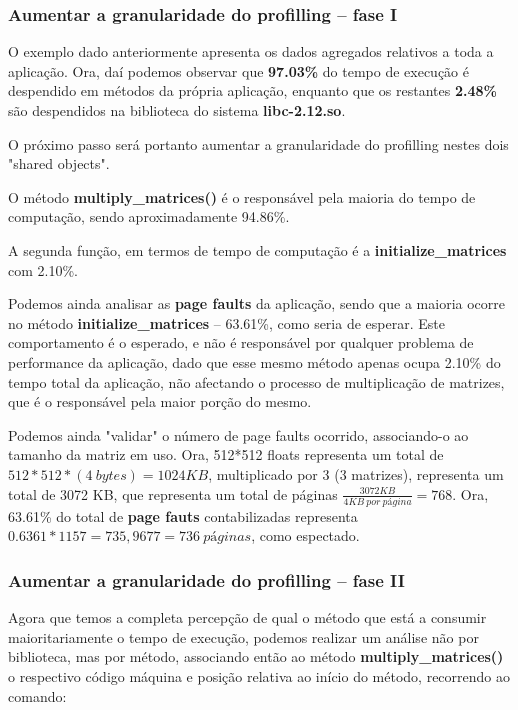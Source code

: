 \documentclass[conference,compsoc]{IEEEtran}
\begin{document}
\begin{itemize}


\subsubsection{Aumentar a granularidade do profilling -- fase I}

O exemplo dado anteriormente apresenta os dados agregados relativos a toda a aplicação. Ora, daí podemos observar que   \textbf{97.03\%} do tempo de execução é despendido em métodos da própria aplicação, enquanto que os restantes \textbf{2.48\%} são despendidos na biblioteca do sistema \textbf{libc-2.12.so}.\par 
O próximo passo será portanto aumentar a granularidade do profilling nestes dois "shared objects".


O método \textbf{multiply\_matrices()} é o responsável pela maioria do tempo de computação, sendo aproximadamente 94.86\%. \par A segunda função, em termos de tempo de computação é a \textbf{initialize\_matrices} com 2.10\%. \par 
Podemos ainda analisar as \textbf{page faults} da aplicação, sendo que a maioria ocorre no método \textbf{initialize\_matrices} -- 63.61\%, como seria de esperar. Este comportamento é o esperado, e não é responsável por qualquer problema de performance da aplicação, dado que esse mesmo método apenas ocupa 2.10\% do tempo total da aplicação, não afectando o processo de multiplicação de matrizes, que é o responsável pela maior porção do mesmo.\par 
Podemos ainda "validar" o número de page faults ocorrido, associando-o ao tamanho da matriz em uso. Ora, 512*512 floats representa um total de $512*512*(4\ bytes) = 1024KB $, multiplicado por 3 (3 matrizes), representa um total de 3072 KB, que representa um total de páginas $\frac{3072KB}{4KB\ por\ página} = 768$. Ora, 63.61\% do total de \textbf{page fauts} contabilizadas representa $0.6361 * 1157 = 735,9677 = 736\ páginas$, como espectado.

\subsubsection{Aumentar a granularidade do profilling -- fase II}
Agora que temos a completa percepção de qual o método que está a consumir maioritariamente o tempo de execução, podemos realizar um análise não por biblioteca, mas por método, associando então ao método \textbf{multiply\_matrices()} o respectivo código máquina e posição relativa ao início do método, recorrendo ao comando:


\end{itemize}
\end{document}
